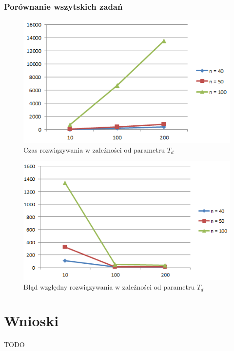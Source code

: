 \documentclass[wide,a4paper,titlepage,12pt] {article}
\begin{document}
\subsubsection{Porównanie wszytskich zadań}
\begin{figure}[htbp]
  \begin{center}
         \includegraphics[scale=0.8]{charts/timeAll.PNG}
         \caption{Czas rozwiązywania w zależności od parametru $T_d$}
  \end{center}
\end{figure}

\begin{figure}[htbp]
  \begin{center}
         \includegraphics[scale=0.8]{charts/diffAll.PNG}
         \caption{Błąd względny rozwiązywania w zależności od parametru $T_d$}
  \end{center}
\end{figure}

\section{Wnioski}
\paragraph{}
TODO
\end{document}
